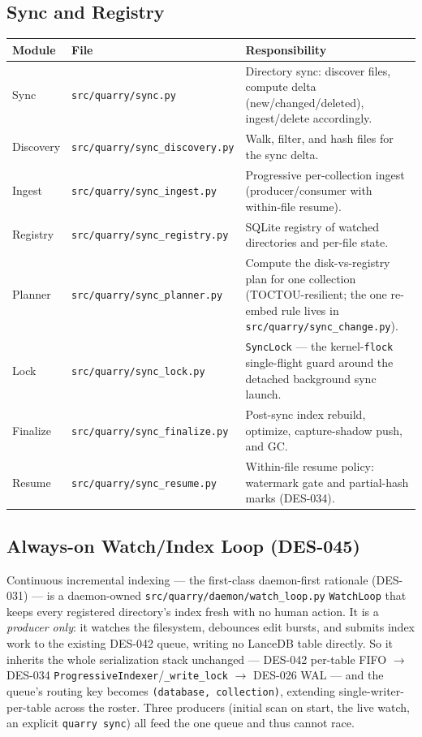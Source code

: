 \documentclass[a4paper,10pt]{article}
\newcommand{\modpath}[1]{\texttt{src/quarry/#1}}
\begin{document}
\subsection{Sync and Registry}

\begin{center}
\begin{tabular}{llp{7cm}}
\toprule
\textbf{Module} & \textbf{File} & \textbf{Responsibility} \\
\midrule
Sync       & \modpath{sync.py}           & Directory sync: discover
             files, compute delta (new/changed/deleted),
             ingest/delete accordingly. \\
Discovery  & \modpath{sync\_discovery.py} & Walk, filter, and hash files
             for the sync delta. \\
Ingest     & \modpath{sync\_ingest.py}    & Progressive per-collection
             ingest (producer/consumer with within-file resume). \\
Registry   & \modpath{sync\_registry.py}  & SQLite registry of watched
             directories and per-file state. \\
Planner    & \modpath{sync\_planner.py}   & Compute the disk-vs-registry
             plan for one collection (TOCTOU-resilient; the one
             re-embed rule lives in \modpath{sync\_change.py}). \\
Lock       & \modpath{sync\_lock.py}      & \texttt{SyncLock} --- the
             kernel-\texttt{flock} single-flight guard around the detached
             background sync launch. \\
Finalize   & \modpath{sync\_finalize.py}  & Post-sync index rebuild,
             optimize, capture-shadow push, and GC. \\
Resume     & \modpath{sync\_resume.py}    & Within-file resume policy:
             watermark gate and partial-hash marks (DES-034). \\
\bottomrule
\end{tabular}
\end{center}

\subsection{Always-on Watch/Index Loop (DES-045)}

Continuous incremental indexing --- the first-class daemon-first rationale
(DES-031) --- is a daemon-owned \modpath{daemon/watch\_loop.py}
\texttt{WatchLoop} that keeps every registered directory's index fresh with no
human action. It is a \emph{producer only}: it watches the filesystem,
debounces edit bursts, and submits index work to the existing DES-042 queue,
writing no LanceDB table directly. So it inherits the whole serialization
stack unchanged --- DES-042 per-table FIFO $\to$ DES-034
\texttt{ProgressiveIndexer}/\texttt{\_write\_lock} $\to$ DES-026 WAL --- and the
queue's routing key becomes \texttt{(database, collection)}, extending
single-writer-per-table across the roster. Three producers (initial scan on
start, the live watch, an explicit \texttt{quarry sync}) all feed the one queue
and thus cannot race.
\end{document}
